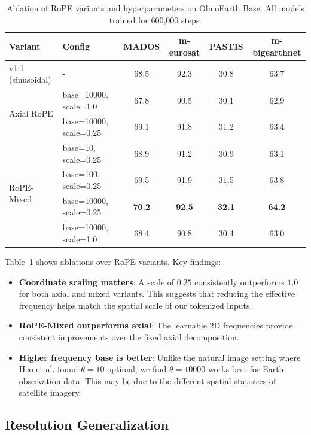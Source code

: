 \documentclass{article}
\begin{document}
\begin{table}[h!]
\centering
\caption{Ablation of RoPE variants and hyperparameters on OlmoEarth Base. All models trained for 600,000 steps.}
\label{tab:ablation}
\small
\begin{tabular}{ll|cccc}
\toprule
\textbf{Variant} & \textbf{Config} & \textbf{MADOS} & \textbf{m-eurosat} & \textbf{PASTIS} & \textbf{m-bigearthnet} \\
\midrule
v1.1 (sinusoidal) & - & 68.5 & 92.3 & 30.8 & 63.7 \\
\midrule
\multirow{2}{*}{Axial RoPE} 
& base=10000, scale=1.0 & 67.8 & 90.5 & 30.1 & 62.9 \\
& base=10000, scale=0.25 & 69.1 & 91.8 & 31.2 & 63.4 \\
\midrule
\multirow{4}{*}{RoPE-Mixed}
& base=10, scale=0.25 & 68.9 & 91.2 & 30.9 & 63.1 \\
& base=100, scale=0.25 & 69.5 & 91.9 & 31.5 & 63.8 \\
& base=10000, scale=0.25 & \textbf{70.2} & \textbf{92.5} & \textbf{32.1} & \textbf{64.2} \\
& base=10000, scale=1.0 & 68.4 & 90.8 & 30.4 & 63.0 \\
\bottomrule
\end{tabular}
\end{table}

Table~\ref{tab:ablation} shows ablations over RoPE variants. Key findings:
\begin{itemize}
    \item \textbf{Coordinate scaling matters}: A scale of $0.25$ consistently outperforms $1.0$ for both axial and mixed variants. This suggests that reducing the effective frequency helps match the spatial scale of our tokenized inputs.
    
    \item \textbf{RoPE-Mixed outperforms axial}: The learnable 2D frequencies provide consistent improvements over the fixed axial decomposition.
    
    \item \textbf{Higher frequency base is better}: Unlike the natural image setting where Heo et al. found $\theta=10$ optimal, we find $\theta=10000$ works best for Earth observation data. This may be due to the different spatial statistics of satellite imagery.
\end{itemize}

\subsection{Resolution Generalization}
\end{document}
